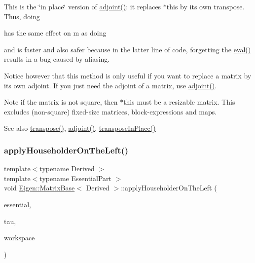 This is the \char`\"{}in place\char`\"{} version of \mbox{\hyperlink{class_eigen_1_1_matrix_base_afacca1f88da57e5cd87dd07c8ff926bb}{adjoint()}}\+: it replaces {\ttfamily $\ast$this} by its own transpose. Thus, doing 
\begin{DoxyCode}{0}
\end{DoxyCode}
 has the same effect on m as doing 
\begin{DoxyCode}{0}
\end{DoxyCode}
 and is faster and also safer because in the latter line of code, forgetting the \mbox{\hyperlink{class_eigen_1_1_dense_base_a5df64c66228ba75bbc66db2584185527}{eval()}} results in a bug caused by aliasing.

Notice however that this method is only useful if you want to replace a matrix by its own adjoint. If you just need the adjoint of a matrix, use \mbox{\hyperlink{class_eigen_1_1_matrix_base_afacca1f88da57e5cd87dd07c8ff926bb}{adjoint()}}.

\begin{DoxyNote}{Note}
if the matrix is not square, then {\ttfamily $\ast$this} must be a resizable matrix. This excludes (non-\/square) fixed-\/size matrices, block-\/expressions and maps.
\end{DoxyNote}
\begin{DoxySeeAlso}{See also}
\mbox{\hyperlink{class_eigen_1_1_dense_base_ac8952c19644a4ac7e41bea45c19b909c}{transpose()}}, \mbox{\hyperlink{class_eigen_1_1_matrix_base_afacca1f88da57e5cd87dd07c8ff926bb}{adjoint()}}, \mbox{\hyperlink{class_eigen_1_1_dense_base_ac501bd942994af7a95d95bee7a16ad2a}{transpose\+In\+Place()}} 
\end{DoxySeeAlso}
\mbox{\label{class_eigen_1_1_matrix_base_a8f2c8059ef3f04cfa0c73b4c012db855}} 
\subsubsection{\texorpdfstring{applyHouseholderOnTheLeft()}{applyHouseholderOnTheLeft()}}
{\footnotesize\ttfamily template$<$typename Derived $>$ \\
template$<$typename Essential\+Part $>$ \\
void \mbox{\hyperlink{class_eigen_1_1_matrix_base}{Eigen\+::\+Matrix\+Base}}$<$ Derived $>$\+::apply\+Householder\+On\+The\+Left (\begin{DoxyParamCaption}\item[{const Essential\+Part \&}]{essential,  }\item[{const \mbox{\hyperlink{class_eigen_1_1_dense_base_a5feed465b3a8e60c47e73ecce83e39a2}{Scalar}} \&}]{tau,  }\item[{\mbox{\hyperlink{class_eigen_1_1_dense_base_a5feed465b3a8e60c47e73ecce83e39a2}{Scalar}} $\ast$}]{workspace }\end{DoxyParamCaption})}

